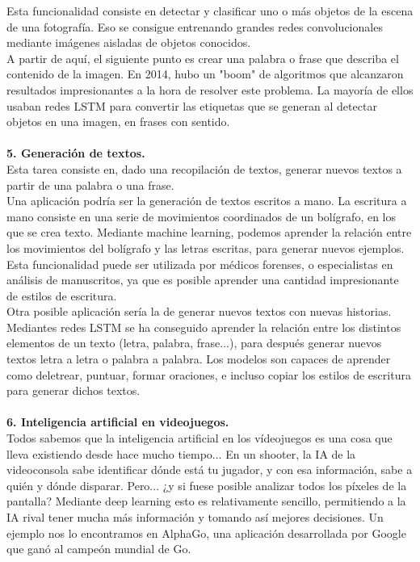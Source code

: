 Esta funcionalidad consiste en detectar y clasificar uno o más objetos de la escena de una fotografía. Eso se consigue entrenando grandes redes convolucionales mediante imágenes aisladas de objetos conocidos.\\
A partir de aquí, el siguiente punto es crear una palabra o frase que describa el contenido de la imagen. En 2014, hubo un "boom" de algoritmos que alcanzaron resultados impresionantes a la hora de resolver este problema. La mayoría de ellos usaban redes LSTM para convertir las etiquetas que se generan al detectar objetos en una imagen, en frases con sentido.\\
\\\textbf{5. Generación de textos.}\\
Esta tarea consiste en, dado una recopilación de textos, generar nuevos textos a partir de una palabra o una frase.\\
Una aplicación podría ser la generación de textos escritos a mano. La escritura a mano consiste en una serie de movimientos coordinados de un bolígrafo, en los que se crea texto. Mediante machine learning, podemos aprender la relación entre los movimientos del bolígrafo y las letras escritas, para generar nuevos ejemplos. Esta funcionalidad puede ser utilizada por médicos forenses, o especialistas en análisis de manuscritos, ya que es posible aprender una cantidad impresionante de estilos de escritura.\\
Otra posible aplicación sería la de generar nuevos textos con nuevas historias. Mediantes redes LSTM se ha conseguido aprender la relación entre los distintos elementos de un texto (letra, palabra, frase...), para después generar nuevos textos letra a letra o palabra a palabra. Los modelos son capaces de aprender como deletrear, puntuar, formar oraciones, e incluso copiar los estilos de escritura para generar dichos textos.\\
\\\textbf{6. Inteligencia artificial en videojuegos.}\\
Todos sabemos que la inteligencia artificial en los vídeojuegos es una cosa que lleva existiendo desde hace mucho tiempo... En un shooter, la IA de la videoconsola sabe identificar dónde está tu jugador, y con esa información, sabe a quién y dónde disparar. Pero... ¿y si fuese posible analizar todos los píxeles de la pantalla? Mediante deep learning esto es relativamente sencillo, permitiendo a la IA rival tener mucha más información y tomando así mejores decisiones. Un ejemplo nos lo encontramos en AlphaGo, una aplicación desarrollada por Google que ganó al campeón mundial de Go.\\\\
